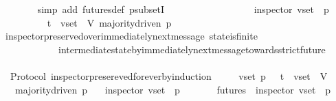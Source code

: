 \begin{isabellebody}
\ \ \ \ \ \ \isamarkupfalse%
\ {\isacharparenleft}simp\ add{\isacharcolon}\ futures{\isacharunderscore}def\ psubsetI{\isacharparenright}\ \ \ \ \ \ \isanewline
\ \ \ \ \isanewline
\ \ \ \ \isamarkupfalse%
\ \isamarkupfalse%
\ {\isachardoublequoteopen}inspector\ {\isacharparenleft}v{\isacharunderscore}set{\isacharcomma}\ {\isasymsigma}{\isacharprime}{\isacharcomma}\ p{\isacharparenright}{\isachardoublequoteclose}\isanewline
\ \ \ \ \ \ \isamarkupfalse%
\ {\isacartoucheopen}{\isasymsigma}\ {\isasymin}\ {\isasymSigma}t\ {\isasymand}\ v{\isacharunderscore}set\ {\isasymsubseteq}\ V{\isacartoucheclose}\ {\isacartoucheopen}majority{\isacharunderscore}driven\ p{\isacartoucheclose}\ \isanewline
\ \ \ \ \ \ \isamarkupfalse%
\ inspector{\isacharunderscore}preserved{\isacharunderscore}over{\isacharunderscore}immediately{\isacharunderscore}next{\isacharunderscore}message\ state{\isacharunderscore}is{\isacharunderscore}finite\isanewline
\ \ \ \ \ \ \ \ \ \ \ \ intermediate{\isacharunderscore}state{\isacharunderscore}by{\isacharunderscore}immediately{\isacharunderscore}next{\isacharunderscore}message{\isacharunderscore}towards{\isacharunderscore}strict{\isacharunderscore}future\ \isanewline
\ \ \ \ \ \ \isamarkupfalse%
\ \ \ \ \ \ \ \ \ \ \ \ \ \ \ \isanewline
\ \ \ \ \isamarkupfalse%
\isanewline
\ \ \isamarkupfalse%
%
\endisatagproof
{\isafoldproof}%
%
\isadelimproof
\isanewline
%
\endisadelimproof
\isanewline
{}\isamarkupfalse%
\ {\isacharparenleft}\ Protocol{\isacharparenright}\ inspector{\isacharunderscore}presereved{\isacharunderscore}forever{\isacharunderscore}by{\isacharunderscore}induction\ {\isacharcolon}\isanewline
\ \ {\isachardoublequoteopen}{\isasymforall}\ {\isasymsigma}\ v{\isacharunderscore}set\ p{\isachardot}\ {\isasymsigma}\ {\isasymin}\ {\isasymSigma}t\ {\isasymand}\ v{\isacharunderscore}set\ {\isasymsubseteq}\ V\ \isanewline
\ \ {\isasymlongrightarrow}\ majority{\isacharunderscore}driven\ p\isanewline
\ \ {\isasymlongrightarrow}\ inspector\ {\isacharparenleft}v{\isacharunderscore}set{\isacharcomma}\ {\isasymsigma}{\isacharcomma}\ p{\isacharparenright}\ \isanewline
\ \ {\isasymlongrightarrow}\ {\isacharparenleft}{\isasymforall}\ {\isasymsigma}{\isacharprime}\ {\isasymin}\ futures\ {\isasymsigma}{\isachardot}\ inspector\ {\isacharparenleft}v{\isacharunderscore}set{\isacharcomma}\ {\isasymsigma}{\isacharprime}{\isacharcomma}\ p{\isacharparenright}{\isacharparenright}{\isachardoublequoteclose}\isanewline

\end{isabellebody}
